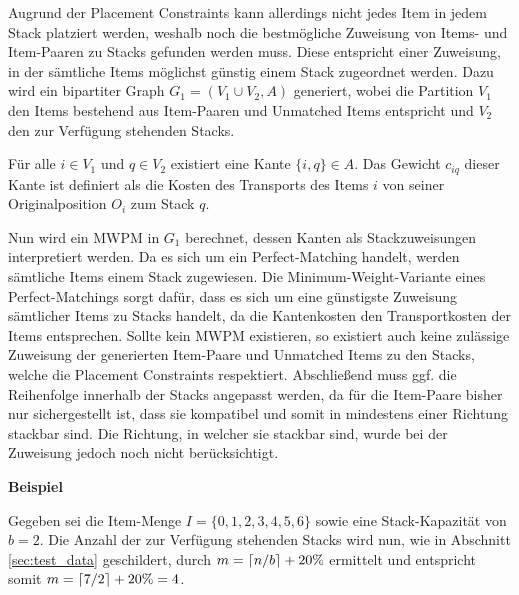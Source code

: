 Augrund der Placement Constraints kann allerdings nicht jedes Item in jedem Stack platziert werden, weshalb noch die bestmögliche Zuweisung von
Items- und Item-Paaren zu Stacks gefunden werden muss. Diese entspricht einer Zuweisung, in der sämtliche Items möglichst günstig einem Stack zugeordnet werden. Dazu wird ein bipartiter Graph $G_1 = (V_1 \cup V_2, A)$ generiert, wobei die Partition $V_1$ den Items bestehend aus Item-Paaren und Unmatched Items entspricht und $V_2$ den zur Verfügung stehenden Stacks.

Für alle $i \in V_1$ und $q \in V_2$ existiert eine Kante $\{i, q\} \in A$. Das Gewicht $c_{iq}$ dieser Kante ist definiert als die Kosten
des Transports des Items $i$ von seiner Originalposition $O_i$ zum Stack $q$.

Nun wird ein \textsc{MWPM} in $G_1$ berechnet, dessen Kanten als Stackzuweisungen interpretiert werden.
Da es sich um ein Perfect-Matching handelt, werden sämtliche Items einem Stack zugewiesen. Die Minimum-Weight-Variante eines
Perfect-Matchings sorgt dafür, dass es sich um eine günstigste Zuweisung sämtlicher Items zu Stacks handelt, da die Kantenkosten
den Transportkosten der Items entsprechen. Sollte kein \textsc{MWPM} existieren, so existiert auch keine zulässige Zuweisung
der generierten Item-Paare und Unmatched Items zu den Stacks, welche die Placement Constraints respektiert.
Abschließend muss ggf. die Reihenfolge innerhalb der Stacks angepasst werden, da für die Item-Paare bisher nur sichergestellt ist,
dass sie kompatibel und somit in mindestens einer Richtung stackbar sind. Die Richtung, in welcher sie stackbar sind, wurde bei der Zuweisung
jedoch noch nicht berücksichtigt.

\pagebreak

\textbf{Beispiel}

Gegeben sei die Item-Menge $I = \{0, 1, 2, 3, 4, 5, 6\}$ sowie eine Stack-Kapazität von $b = 2$.
Die Anzahl der zur Verfügung stehenden Stacks wird nun, wie in Abschnitt \ref{sec:test_data} geschildert,
durch $m = \lceil n / b\rceil + 20 \%$ ermittelt und entspricht somit $m = \lceil7 / 2\rceil + 20 \% = 4$.

